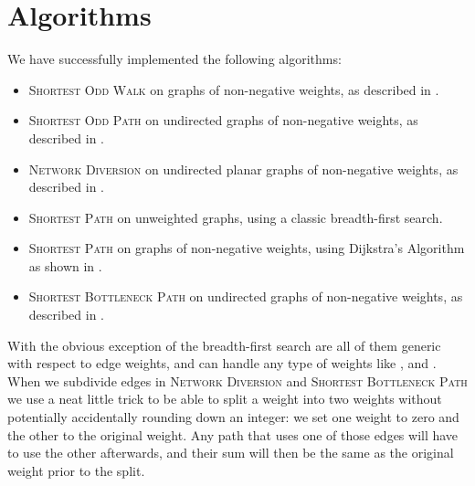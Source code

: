 \section{Algorithms}
We have successfully implemented the following algorithms:

\begin{itemize}
    \item \textsc{Shortest Odd Walk} on graphs of non-negative weights, as described in .
    \item \textsc{Shortest Odd Path} on undirected graphs of non-negative weights, as described in .
    \item \textsc{Network Diversion} on undirected planar graphs of non-negative weights, as described in .
    \item \textsc{Shortest Path} on unweighted graphs, using a classic breadth-first search.
    \item \textsc{Shortest Path} on graphs of non-negative weights, using Dijkstra's Algorithm as shown in .
    \item \textsc{Shortest Bottleneck Path} on undirected graphs of non-negative weights, as described in .
\end{itemize}

With the obvious exception of the breadth-first search are all of them generic with respect to edge weights, and can handle any type of weights like ,  and . When we subdivide edges in \textsc{Network Diversion} and \textsc{Shortest Bottleneck Path} we use a neat little trick to be able to split a weight into two weights without potentially accidentally rounding down an integer: we set one weight to zero and the other to the original weight. Any path that uses one of those edges will have to use the other afterwards, and their sum will then be the same as the original weight prior to the split.

